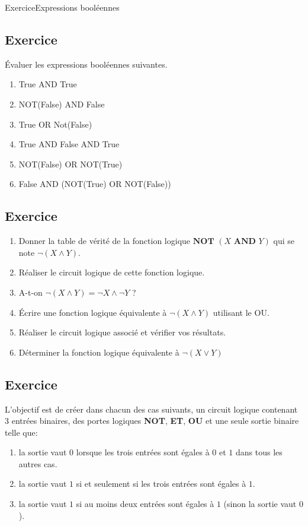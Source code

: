 \documentclass[11pt,a4paper]{article}
\newcounter{numexo}
\begin{document}
\begin{NSI}
{Exercice}{Expressions booléennes}
\end{NSI}


\addtocounter{numexo}{1}
\subsection*{\Large Exercice \thenumexo }
Évaluer les expressions booléennes suivantes.
\begin{enumerate}
\item True AND True
\item NOT(False) AND False
\item True OR Not(False)
\item True AND False AND True
\item NOT(False) OR NOT(True)
\item False AND (NOT(True) OR NOT(False))
\end{enumerate}

\addtocounter{numexo}{1}
\subsection*{\Large Exercice \thenumexo }

\begin{enumerate}
\item Donner la table de vérité de la fonction logique $\textbf{NOT~}(X \textbf{~AND~} Y)$ qui se note $\neg(X \wedge Y)$.
\item Réaliser le circuit logique de cette fonction logique.
\item A-t-on $\neg(X \wedge Y)=\neg X \wedge \neg Y$ ? 
\item Écrire une fonction logique équivalente à $\neg(X \wedge Y)$ utilisant le OU.
\item Réaliser le circuit logique associé et vérifier vos résultats.
\item Déterminer la fonction logique équivalente à $\neg( X \vee Y)$
\end{enumerate}

\addtocounter{numexo}{1}
\subsection*{\Large Exercice \thenumexo }
L'objectif est de créer dans chacun des cas suivants, un circuit logique contenant 3 entrées binaires, des portes logiques \textbf{NOT}, \textbf{ET}, \textbf{OU} et une seule sortie binaire telle que:
\begin{enumerate}
\item la sortie vaut $0$ lorsque les trois entrées sont égales à $0$ et $1$ dans tous les autres cas.
\item la sortie vaut $1$ si et seulement si les trois entrées sont égales à $1$.
\item la sortie vaut $1$ si au moins deux entrées sont égales à $1$ (sinon la sortie vaut $0$).
\end{enumerate}
\end{document}
